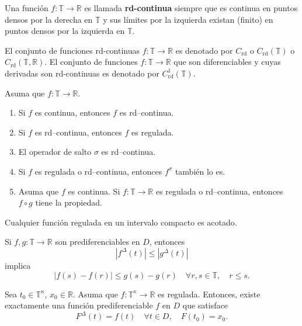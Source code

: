 \begin{frame}
\begin{definition}
Una función $f\colon\mathds{T}\rightarrow\mathds{R}$ es llamada \textbf{rd-continua} siempre que es continua en puntos densos por la derecha en $\mathds{T}$ y sus límites por la izquierda existan (finito) en puntos densos por la izquierda en $\mathds{T}$.
\end{definition}

\begin{remark}
El conjunto de funciones rd-continuas $f\colon\mathds{T}\rightarrow\mathds{R}$ es denotado por $C_{\text{rd}}$ o $C_{\text{rd}}\left(\mathds{T}\right)$ o $C_{\text{rd}}\left(\mathds{T},\mathds{R}\right)$. El conjunto de funciones $f\colon\mathds{T}\rightarrow\mathds{R}$ que son diferenciables  y cuyas derivadas son rd-continuas es denotado por $C^{1}_{\text{rd}}\left(\mathds{T}\right)$.
\end{remark}

\begin{theorem}
		Asuma que $f\colon\mathds{T}\rightarrow\mathds{R}$.
		\begin{enumerate}
			\item Si $f$ es continua, entonces $f$ es rd--continua.
			\item Si $f$ es rd--continua, entonces $f$ es regulada.
			\item El operador de salto $\sigma$ es rd--continua.
			\item Si $f$ es regulada o rd--continua, entonces $f^{\sigma}$ también lo es.
			\item Asuma que $f$ es continua. Si $f\colon\mathds{T}\rightarrow\mathds{R}$ es regulada o rd--continua, entonces $f\circ g$ tiene la propiedad.
		\end{enumerate}
\end{theorem}
\end{frame}

\begin{frame}
	\begin{theorem}
		Cualquier función regulada en un intervalo compacto es acotado.
	\end{theorem}

	\begin{theorem}
		Si $f,g\colon\mathds{T}\rightarrow\mathds{R}$ son prediferenciables en $D$, entonces \[ \left|f^{\Delta}\left(t\right)\right|\leq\left|g^{\Delta}\left(t\right)\right| \] implica \[ \left|f\left(s\right)-f\left(r\right)\right|\leq g\left(s\right)-g\left(r\right)\quad\forall r,s\in\mathds{T},\quad r\leq s. \]
	\end{theorem}

	\begin{theorem}\label{thm:unicidad}
		Sea $t_{0}\in\mathds{T}^{\kappa}$, $x_{0}\in\mathds{R}$. Asuma que $f\colon\mathds{T}^{\kappa}\rightarrow\mathds{R}$ es regulada. Entonces, existe exactamente una función prediferenciable $f$ en $D$ que satisface \[ F^{\Delta}\left(t\right)=f\left(t\right)\quad\forall t\in D,\quad F\left(t_{0}\right)=x_{0}. \]
	\end{theorem}
\end{frame}

